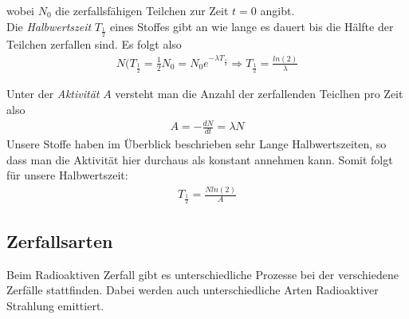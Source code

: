 \documentclass[12pt]{article}
\begin{document}
wobei $N_0$ die zerfallsfähigen Teilchen zur Zeit $t=0$ angibt.\\
Die \textit{Halbwertszeit} $T_{\frac{1}{2}}$ eines Stoffes gibt an wie lange es dauert bis die Hälfte der Teilchen zerfallen sind. Es folgt also
\begin{align}
N(T_{\frac{1}{2}} = \frac{1}{2} N_0 = N_0 e^{ -\lambda T_{\frac{1}{2}}} \Rightarrow T_{\frac{1}{2}} = \frac{ln(2)}{\lambda}
\end{align}

Unter der \textit{Aktivität} $A$ versteht man die Anzahl der zerfallenden Teiclhen pro Zeit also 
\begin{align}
 A = -\frac{dN}{dt} = \lambda N
\end{align}
Unsere Stoffe haben im Überblick beschrieben sehr Lange Halbwertszeiten, so dass man die Aktivität hier durchaus als konstant annehmen kann. Somit folgt für unsere Halbwertszeit:
\begin{align}
 T_{\frac{1}{2}} = \frac{N ln(2)}{A}
\end{align}

\subsection{Zerfallsarten}

Beim Radioaktiven Zerfall gibt es unterschiedliche Prozesse bei der verschiedene Zerfälle stattfinden. Dabei werden auch unterschiedliche Arten Radioaktiver Strahlung emittiert.
\end{document}
